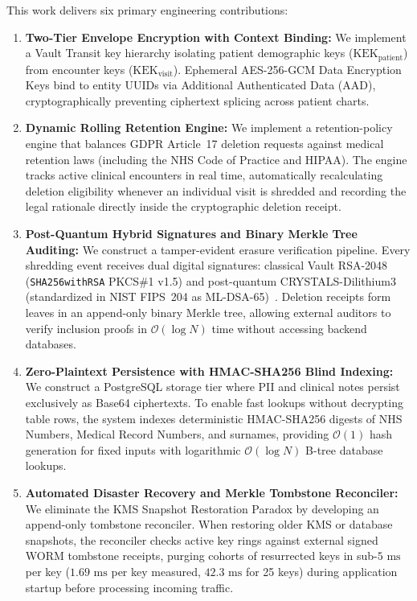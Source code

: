 This work delivers six primary engineering contributions:
\begin{enumerate}
    \item \textbf{Two-Tier Envelope Encryption with Context Binding:} We implement a Vault Transit key hierarchy isolating patient demographic keys ($\text{KEK}_{\text{patient}}$) from encounter keys ($\text{KEK}_{\text{visit}}$). Ephemeral AES-256-GCM Data Encryption Keys bind to entity UUIDs via Additional Authenticated Data (AAD), cryptographically preventing ciphertext splicing across patient charts.

    \item \textbf{Dynamic Rolling Retention Engine:} We implement a retention-policy engine that balances GDPR Article~17 deletion requests against medical retention laws (including the NHS Code of Practice and HIPAA). The engine tracks active clinical encounters in real time, automatically recalculating deletion eligibility whenever an individual visit is shredded and recording the legal rationale directly inside the cryptographic deletion receipt.

    \item \textbf{Post-Quantum Hybrid Signatures and Binary Merkle Tree Auditing:} We construct a tamper-evident erasure verification pipeline. Every shredding event receives dual digital signatures: classical Vault RSA-2048 (\texttt{SHA256withRSA} PKCS\#1 v1.5) and post-quantum CRYSTALS-Dilithium3 (standardized in NIST FIPS~204 as ML-DSA-65)~\cite{nist_fips_204}. Deletion receipts form leaves in an append-only binary Merkle tree, allowing external auditors to verify inclusion proofs in $\mathcal{O}(\log N)$ time without accessing backend databases.

    \item \textbf{Zero-Plaintext Persistence with HMAC-SHA256 Blind Indexing:} We construct a PostgreSQL storage tier where PII and clinical notes persist exclusively as Base64 ciphertexts. To enable fast lookups without decrypting table rows, the system indexes deterministic HMAC-SHA256 digests of NHS Numbers, Medical Record Numbers, and surnames, providing $\mathcal{O}(1)$ hash generation for fixed inputs with logarithmic $\mathcal{O}(\log N)$ B-tree database lookups.

    \item \textbf{Automated Disaster Recovery and Merkle Tombstone Reconciler:} We eliminate the KMS Snapshot Restoration Paradox by developing an append-only tombstone reconciler. When restoring older KMS or database snapshots, the reconciler checks active key rings against external signed WORM tombstone receipts, purging cohorts of resurrected keys in sub-$5\text{~ms}$ per key ($1.69\text{~ms}$ per key measured, $42.3\text{~ms}$ for 25 keys) during application startup before processing incoming traffic.


\end{enumerate}
